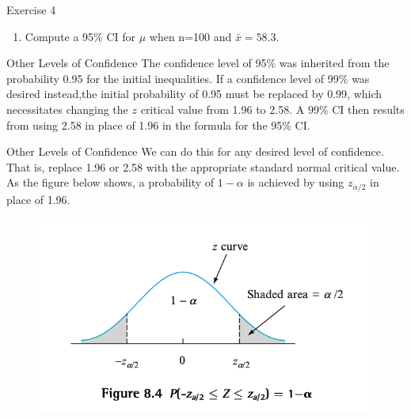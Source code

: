 \documentclass[
  ignorenonframetext,
]{beamer}
\providecommand{\tightlist}{%
  \setlength{\itemsep}{0pt}\setlength{\parskip}{0pt}}\usepackage{longtable,booktabs,array}
\begin{document}
\begin{frame}{Exercise 4}
\protect\hypertarget{exercise-4-1}{}
\begin{enumerate}[<+->]
[a.]
\setcounter{enumi}{1}
\tightlist
\item
  Compute a 95\% CI for \(\mu\) when n=100 and \(\bar{x} = 58.3\).
\end{enumerate}
\end{frame}

\begin{frame}{Other Levels of Confidence}
\protect\hypertarget{other-levels-of-confidence}{}
The confidence level of 95\% was inherited from the probability 0.95 for
the initial inequalities. If a confidence level of 99\% was desired
instead,the initial probability of 0.95 must be replaced by 0.99, which
necessitates changing the \(z\) critical value from 1.96 to 2.58. A 99\%
CI then results from using 2.58 in place of 1.96 in the formula for the
95\% CI.
\end{frame}

\begin{frame}{Other Levels of Confidence}
\protect\hypertarget{other-levels-of-confidence-1}{}
We can do this for any desired level of confidence. That is, replace
1.96 or 2.58 with the appropriate standard normal critical value. As the
figure below shows, a probability of \(1-\alpha\) is achieved by using
\(z_{\alpha/2}\) in place of 1.96.

\begin{figure}

{\centering \includegraphics{images/confidencelevel.png}

}

\end{figure}
\end{frame}
\end{document}
